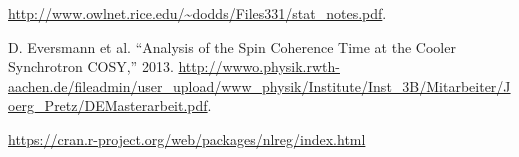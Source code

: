 \documentclass{article}
\begin{document}
\begin{thebibliography}{9}
	\url{http://www.owlnet.rice.edu/~dodds/Files331/stat_notes.pdf}.
	
	D. Eversmann et al. ``Analysis of the Spin Coherence Time at the Cooler Synchrotron COSY,'' 2013. \url{http://wwwo.physik.rwth-aachen.de/fileadmin/user_upload/www_physik/Institute/Inst_3B/Mitarbeiter/Joerg_Pretz/DEMasterarbeit.pdf}.
	
	\url{https://cran.r-project.org/web/packages/nlreg/index.html}
	
\end{thebibliography}
\end{document}
